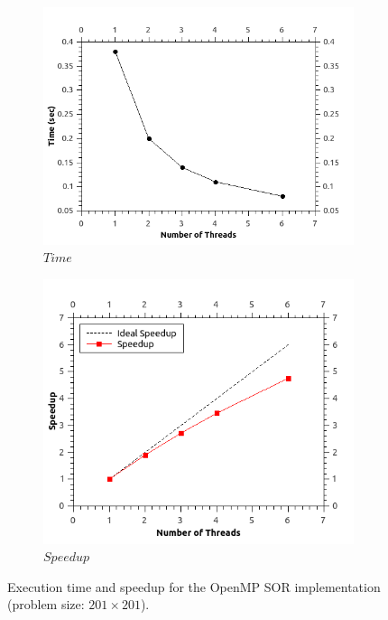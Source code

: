 \documentclass[11pt]{report}
\begin{document}
\begin{figure}[th!]
\centering
\begin{subfigure}{0.45\textwidth}
  \centering
  \includegraphics[width=0.8\linewidth]{images/sor_time_201}
  \caption{$Time$}
\end{subfigure}
\begin{subfigure}{0.45\textwidth}
  \centering
  \includegraphics[width=0.8\linewidth]{images/sor_speedup_201}
  \caption{$Speedup$}
\end{subfigure}
\caption{Execution time and speedup for the OpenMP SOR implementation (problem size: $201 \times 201$). }
\label{fig:example5.7}
\end{figure}
\end{document}
